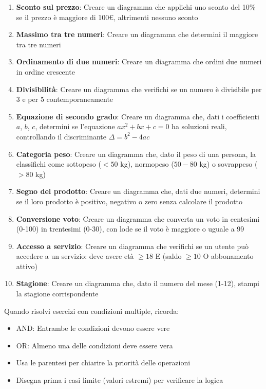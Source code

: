 \documentclass[a4paper,16pt]{article}
\begin{document}
\begin{enumerate}[leftmargin=*]
    \item \textbf{Sconto sul prezzo}: Creare un diagramma che applichi uno sconto del 10\% se il prezzo è maggiore di 100€, altrimenti nessuno sconto
    
    \item \textbf{Massimo tra tre numeri}: Creare un diagramma che determini il maggiore tra tre numeri
    
    \item \textbf{Ordinamento di due numeri}: Creare un diagramma che ordini due numeri in ordine crescente
    
    \item \textbf{Divisibilità}: Creare un diagramma che verifichi se un numero è divisibile per 3 e per 5 contemporaneamente
    
    \item \textbf{Equazione di secondo grado}: Creare un diagramma che, dati i coefficienti $a$, $b$, $c$, determini se l'equazione $ax^2 + bx + c = 0$ ha soluzioni reali, controllando il discriminante $\Delta = b^2 - 4ac$
    
    \item \textbf{Categoria peso}: Creare un diagramma che, dato il peso di una persona, la classifichi come sottopeso ($<50$ kg), normopeso ($50-80$ kg) o sovrappeso ($>80$ kg)
    
    \item \textbf{Segno del prodotto}: Creare un diagramma che, dati due numeri, determini se il loro prodotto è positivo, negativo o zero senza calcolare il prodotto
    
    \item \textbf{Conversione voto}: Creare un diagramma che converta un voto in centesimi (0-100) in trentesimi (0-30), con lode se il voto è maggiore o uguale a 99
    
    \item \textbf{Accesso a servizio}: Creare un diagramma che verifichi se un utente può accedere a un servizio: deve avere età $\geq 18$ E (saldo $\geq 10$ O abbonamento attivo)
    
    \item \textbf{Stagione}: Creare un diagramma che, dato il numero del mese (1-12), stampi la stagione corrispondente
\end{enumerate}

\vspace{1cm}
\begin{tcolorbox}[colback=green!10!white,colframe=green!75!black,title=Suggerimento]
Quando risolvi esercizi con condizioni multiple, ricorda:
\begin{itemize}
    \item AND: Entrambe le condizioni devono essere vere
    \item OR: Almeno una delle condizioni deve essere vera
    \item Usa le parentesi per chiarire la priorità delle operazioni
    \item Disegna prima i casi limite (valori estremi) per verificare la logica
\end{itemize}
\end{tcolorbox}
\end{document}
